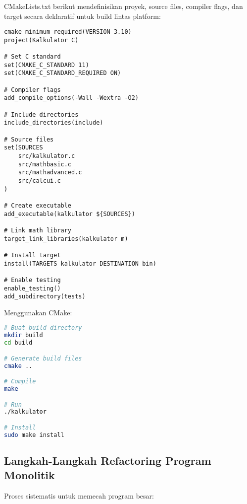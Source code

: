 \documentclass[../main.tex]{subfiles}
\begin{document}
CMakeLists.txt berikut mendefinisikan proyek, source files, compiler flags, dan target secara deklaratif untuk build lintas platform:

\begin{lstlisting}[caption={CMakeLists.txt lengkap}]
cmake_minimum_required(VERSION 3.10)
project(Kalkulator C)

# Set C standard
set(CMAKE_C_STANDARD 11)
set(CMAKE_C_STANDARD_REQUIRED ON)

# Compiler flags
add_compile_options(-Wall -Wextra -O2)

# Include directories
include_directories(include)

# Source files
set(SOURCES
    src/kalkulator.c
    src/mathbasic.c
    src/mathadvanced.c
    src/calcui.c
)

# Create executable
add_executable(kalkulator ${SOURCES})

# Link math library
target_link_libraries(kalkulator m)

# Install target
install(TARGETS kalkulator DESTINATION bin)

# Enable testing
enable_testing()
add_subdirectory(tests)
\end{lstlisting}

Menggunakan CMake:
\begin{lstlisting}[language=bash, caption={Build dengan CMake}]
# Buat build directory
mkdir build
cd build

# Generate build files
cmake ..

# Compile
make

# Run
./kalkulator

# Install
sudo make install
\end{lstlisting}

\subsection{Langkah-Langkah Refactoring Program Monolitik}

Proses sistematis untuk memecah program besar:
\end{document}
